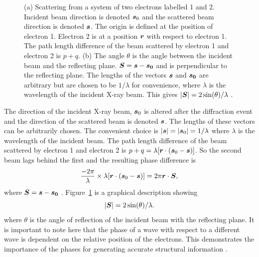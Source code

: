 \begin{figure}
\begin{subfigure}[b]{0.45\textwidth}
                        \caption{}
                        \label{fig:scattering vector}
                \end{subfigure}
                \caption{(a) Scattering from a system of two electrons labelled 1 and 2. Incident beam direction is denoted $\boldsymbol{s}_0$ and the scattered beam direction is denoted $\boldsymbol{s}$.
                The origin is defined at the position of electron 1. Electron 2 is at a position $\boldsymbol{r}$ with respect to electron 1.
                The path length difference of the beam scattered by electron 1 and electron 2 is $p + q$.
                (b) The angle $\theta$ is the angle between the incident beam and the reflecting plane.
                $\boldsymbol{S} = \boldsymbol{s} - \boldsymbol{s_0}$ and is perpendicular to the reflecting plane.
                The lengths of the vectors $\boldsymbol{s}$ and $\boldsymbol{s_0}$ are arbitrary but are chosen to be $1/\lambda$ for convenience, where $\lambda$ is the wavelength of the incident X-ray beam.
                This gives $|\boldsymbol{S}| = 2 \sin(\theta)/\lambda$ \cite{drenth1999}.}
        		\label{fig:Scattering from two electrons}
            \end{figure}
            The direction of the incident X-ray beam, $\boldsymbol{s}_0$ is altered after the diffraction event and the direction of the scattered beam is denoted $\boldsymbol{s}$.
            The lengths of these vectors can be arbitrarily chosen.
            The convenient choice is $|\boldsymbol{s}| = |\boldsymbol{s}_0| = 1/\lambda$ where $\lambda$ is the wavelength of the incident beam.
            The path length difference of the beam scattered by electron 1 and electron 2 is $p + q = \lambda[\boldsymbol{r} \cdot (\boldsymbol{s}_0 - \boldsymbol{s})]$.
            So the second beam lags behind the first and the resulting phase difference is
            \begin{equation}
                \frac{-2 \pi}{\lambda} \times \lambda[\boldsymbol{r} \cdot (\boldsymbol{s}_0 - \boldsymbol{s})] = 2 \pi \boldsymbol{r} \cdot \boldsymbol{S},
            \end{equation}
            where $\boldsymbol{S} = \boldsymbol{s} - \boldsymbol{s_0}$ \cite{drenth1999}. Figure~\ref{fig:scattering vector} is a graphical description showing
            \begin{equation}
                |\boldsymbol{S}| = 2 \sin(\theta)/\lambda.
                \label{eq:length of vector S}
            \end{equation}
            where $\theta$ is the angle of reflection of the incident beam with the reflecting plane.
            It is important to note here that the phase of a wave with respect to a different wave is dependent on the relative position of the electrons.
            This demonstrates the importance of the phases for generating accurate structural information \cite{taylor2003phase, taylor2010}.


